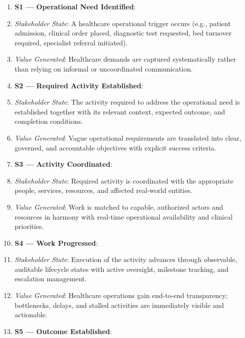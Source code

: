 \begin{enumerate}


\item \textbf{S1 — Operational Need Identified}:

\item \emph{Stakeholder State}: A healthcare operational trigger occurs (e.g., patient admission, clinical order placed, diagnostic test requested, bed turnover required, specialist referral initiated).

\item \emph{Value Generated}: Healthcare demands are captured systematically rather than relying on informal or uncoordinated communication.

\item \textbf{S2 — Required Activity Established}:

\item \emph{Stakeholder State}: The activity required to address the operational need is established together with its relevant context, expected outcome, and completion conditions.

\item \emph{Value Generated}: Vague operational requirements are translated into clear, governed, and accountable objectives with explicit success criteria.

\item \textbf{S3 — Activity Coordinated}:

\item \emph{Stakeholder State}: Required activity is coordinated with the appropriate people, services, resources, and affected real-world entities.

\item \emph{Value Generated}: Work is matched to capable, authorized actors and resources in harmony with real-time operational availability and clinical priorities.

\item \textbf{S4 — Work Progressed}:

\item \emph{Stakeholder State}: Execution of the activity advances through observable, auditable lifecycle states with active oversight, milestone tracking, and escalation management.

\item \emph{Value Generated}: Healthcare operations gain end-to-end transparency; bottlenecks, delays, and stalled activities are immediately visible and actionable.

\item \textbf{S5 — Outcome Established}:


\end{enumerate}

